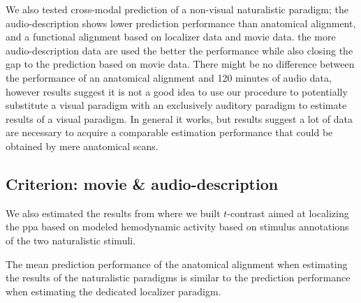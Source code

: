 %
We also tested cross-modal prediction of a non-visual naturalistic paradigm;
%
the audio-description shows lower prediction performance than anatomical
alignment, and a functional alignment based on localizer data and movie data.
%
the more audio-description data are used the better the performance while also
closing the gap to the prediction based on movie data.
%
There might be no difference between the performance of an anatomical alignment
and 120 minutes of audio data, however results suggest it is not a good idea to
use our procedure to potentially substitute a visual paradigm with an
exclusively auditory paradigm to estimate results of a visual paradigm.
%
In general it works, but results suggest a lot of data are necessary to acquire
a comparable estimation performance that could be obtained by mere anatomical
scans.


\subsection{Criterion: movie \& audio-description}





%
We also estimated the results from \citet{haeusler2022processing} where we built
$t$-contrast aimed at localizing the \ac{ppa} based on modeled hemodynamic
activity based on stimulus annotations of the two naturalistic stimuli.

%
The mean prediction performance of the anatomical alignment when
estimating the results of the naturalistic paradigms is similar to the
prediction performance when estimating the dedicated localizer paradigm.


